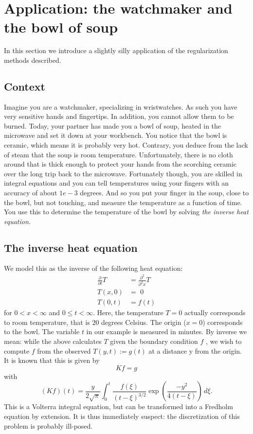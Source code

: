 \documentclass[12pt]{article}
\begin{document}
\section{Application: the watchmaker and the bowl of soup}
In this section we introduce a slightly silly application of the regularization methods described.
\subsection{Context}
Imagine you are a watchmaker, specializing in wristwatches. As such you have very sensitive hands and fingertips. In addition, you cannot allow them to be burned. Today, your partner has made you a bowl of soup, heated in the microwave and set it down at your workbench. You notice that the bowl is ceramic, which means it is probably very hot. Contrary, you deduce from the lack of steam that the soup is room temperature. Unfortunately, there is no cloth around that is thick enough to protect your hands from the scorching ceramic over the long trip back to the microwave. Fortunately though, you are skilled in integral equations and you can tell temperatures using your fingers with an accuracy of about $1e-3$ degrees. And so you put your finger in the soup, close to the bowl, but not touching, and measure the temperature as a function of time. You use this to determine the temperature of the bowl by solving \emph{the inverse heat equation.}
\subsection{The inverse heat equation}
We model this as the inverse of the following heat equation:
\begin{align*}
\frac{\partial}{\partial t}T\,\,\,&=\frac{\partial^2}{\partial^2x}T\\
T(x,0)&=\,\,0\\
T(0,t)&=f(t)
\end{align*}
for $0<x<\infty$ and $0\leq t<\infty$.
Here, the temperature $T = 0$ actually corresponds to room temperature, that is $20$ degrees Celsius. The origin ($x=0$) corresponds to the bowl. The variable $t$ in our example is measured in minutes. By inverse we mean: while the above calculates $T$ given the boundary condition $f$ , we wish to compute $f$ from the observed $T(y, t) := g(t)$ at a distance y from the origin. It is known that this is given by
$$Kf=g$$
with
$$(Kf)(t)=\frac{y}{2\sqrt{\pi}}\int_0^t\frac{f(\xi)}{(t-\xi)^{3/2}}\exp(\frac{-y^2}{4(t-\xi)})\,d\xi.$$
This is a Volterra integral equation, but can be transformed into a Fredholm equation by extension. It is thus immediately suspect: the discretization of this problem is probably ill-posed.
\end{document}
